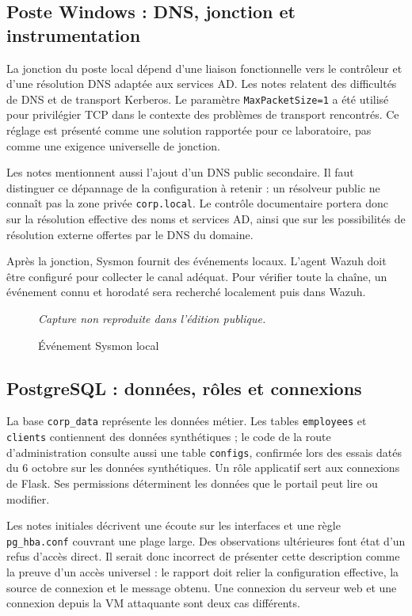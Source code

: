 \documentclass[a4paper,12pt]{report}
\newcommand{\publiccapture}[1]{%
  \begin{figure}[H]\centering
  {\footnotesize\itshape Capture non reproduite dans l'édition publique.}
  \caption{#1}\end{figure}}
\begin{document}
\subsection{Poste Windows : DNS, jonction et instrumentation}
La jonction du poste local dépend d'une liaison fonctionnelle vers le contrôleur et d'une résolution DNS adaptée aux services AD. Les notes relatent des difficultés de DNS et de transport Kerberos. Le paramètre \texttt{MaxPacketSize=1} a été utilisé pour privilégier TCP dans le contexte des problèmes de transport rencontrés. Ce réglage est présenté comme une solution rapportée pour ce laboratoire, pas comme une exigence universelle de jonction.

Les notes mentionnent aussi l'ajout d'un DNS public secondaire. Il faut distinguer ce dépannage de la configuration à retenir : un résolveur public ne connaît pas la zone privée \texttt{corp.local}. Le contrôle documentaire portera donc sur la résolution effective des noms et services AD, ainsi que sur les possibilités de résolution externe offertes par le DNS du domaine.

Après la jonction, Sysmon fournit des événements locaux. L'agent Wazuh doit être configuré pour collecter le canal adéquat. Pour vérifier toute la chaîne, un événement connu et horodaté sera recherché localement puis dans Wazuh.
\publiccapture{Événement Sysmon local}

\subsection{PostgreSQL : données, rôles et connexions}
La base \texttt{corp\_data} représente les données métier. Les tables \texttt{employees} et \texttt{clients} contiennent des données synthétiques ; le code de la route d'administration consulte aussi une table \texttt{configs}, confirmée lors des essais datés du 6 octobre sur les données synthétiques. Un rôle applicatif sert aux connexions de Flask. Ses permissions déterminent les données que le portail peut lire ou modifier.

Les notes initiales décrivent une écoute sur les interfaces et une règle \texttt{pg\_hba.conf} couvrant une plage large. Des observations ultérieures font état d'un refus d'accès direct. Il serait donc incorrect de présenter cette description comme la preuve d'un accès universel : le rapport doit relier la configuration effective, la source de connexion et le message obtenu. Une connexion du serveur web et une connexion depuis la VM attaquante sont deux cas différents.
\end{document}
